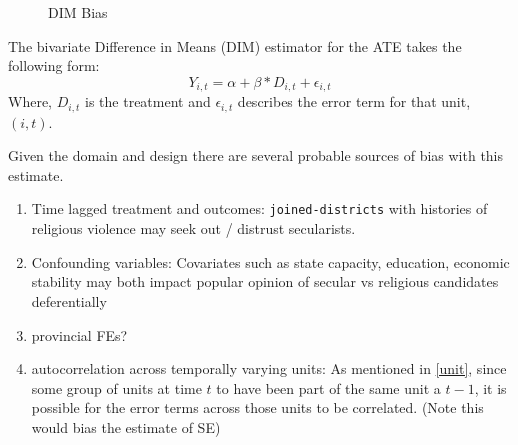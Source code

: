 \documentclass{scrartcl}
\begin{document}
\begin{figure}[h]
  \centering
  \caption{DIM Bias}
  \label{fig:ate_dim}
\end{figure}

The bivariate Difference in Means (DIM) estimator for the ATE takes the following form: 
\begin{equation} \label{eq:1}
  Y_{i,t} = \alpha + \beta * D_{i,t} + \epsilon_{i,t}
\end{equation}
Where, $D_{i,t}$ is the treatment and $\epsilon_{i,t}$ describes the error term for that unit, $(i,t)$.

Given the domain and design there are several probable sources of bias with this estimate.

\begin{enumerate}
\item  Time lagged treatment and outcomes: \texttt{joined-districts} with histories of religious violence may seek out / distrust secularists. 
\item Confounding variables: Covariates such as state capacity, education, economic stability may both impact popular opinion of secular vs religious candidates deferentially
\item provincial FEs?
\item autocorrelation across temporally varying units: As mentioned in \ref{unit}, since some group of units at time $t$ to have been part of the same unit a $t-1$, it is possible for the error terms across those units to be correlated. (Note this would bias the estimate of SE)
\end{enumerate}
\end{document}
